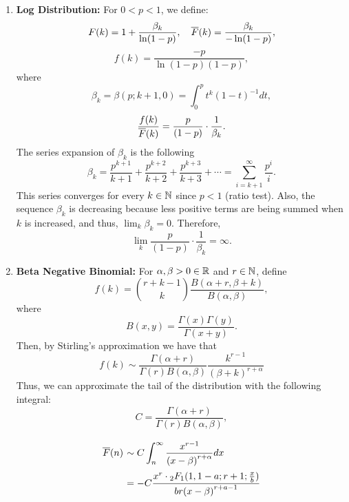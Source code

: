 \begin{enumerate}
    \item \textbf{Log Distribution:} For $0 <p < 1$, we define: 
    \[ F(k) = 1+\frac{\beta_k}{\ln(1-p)},\hspace*{1em} \overline{F}(k) = \frac{\beta_k}{-\ln(1-p)}, \]
    \[ f(k)= \frac{-p}{\ln(1-p)(1-p)}, \]
    where 
    \[ \beta_k = \beta(p; k+1, 0) = \int_{0}^p t^{k}{(1-t)}^{-1} dt ,\]
    \[ \frac{f(k)}{\overline{F}(k)} = \frac{p}{(1-p)} \cdot \frac{1}{\beta_k}.\]
    The series expansion of $\beta_k$ is the following
    \[ \beta_k = \frac{p^{k+1}}{k+1} + \frac{p^{k+2}}{k+2} + \frac{p^{k+3}}{k+3} + \cdots = \sum_{i = k+1}^\infty \frac{p^{i}}{i}. \]
    This series converges for every $k\in\mathbb{N}$ since $p < 1$ (ratio test). Also, the sequence $\beta_k$ is decreasing because less positive terms are being summed when $k$ is increased, and thus, $\lim_k \beta_k = 0$. Therefore,
    \[ \lim_k \frac{p}{(1-p)} \cdot \frac{1}{\beta_k} = \infty. \]

    \item \textbf{Beta Negative Binomial:} For $\alpha, \beta > 0 \in \mathbb{R}$ and $r\in\mathbb{N}$, define
    \[ f(k) = \binom{r+k-1}{k} \frac{B(\alpha + r, \beta+k)}{B(\alpha,\beta)}, \]
    where
    \[ B(x,y) = \frac{\Gamma(x)\Gamma(y)}{\Gamma(x+y)}. \]
    Then, by Stirling's approximation we have that
    \[ f(k) \sim \frac{\Gamma(\alpha + r )}{\Gamma(r)B(\alpha,\beta)} \frac{k^{r-1}}{{(\beta+k)}^{r+\alpha}}\]
    Thus, we can approximate the tail of the distribution with the following integral:
    \[ C = \frac{\Gamma(\alpha + r )}{\Gamma(r)B(\alpha,\beta)}, \]
    \[ \everymath{\displaystyle}
    \arraycolsep=1.8pt\def\arraystretch{2.5}
    \begin{array}{rl}
        \ol{F}(n) & \sim C\int_{n}^{\infty} \frac{x^{r-1}}{{(x-\beta)}^{r+\alpha}} dx\\
        & = -C \frac{x^r \cdot {}_2F_1(1,1-a;r+1; \tfrac{x}{b}) }{br{(x-\beta)}^{r+a-1}}
    \end{array} \]
\end{enumerate}